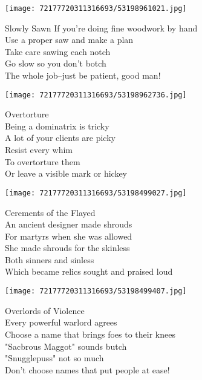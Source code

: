\documentclass[10pt,letterpaper]{article}
\begin{document}
\begin{center}\texttt{[image: 72177720311316693/53198961021.jpg]}
\end{center}
\begin{center}
Slowly Sawn
\vskip 0.2in
If you're doing fine woodwork by hand\\
Use a proper saw and make a plan\\
Take care sawing each notch\\
Go slow so you don't botch\\
The whole job--just be patient, good man!\\
\end{center}
\pagebreak

\begin{center}
\texttt{[image: 72177720311316693/53198962736.jpg]}
\end{center}

\begin{center}
Overtorture\\
\vskip 0.2in
Being a dominatrix is tricky\\
A lot of your clients are picky\\
Resist every whim\\
To overtorture them\\
Or leave a visible mark or hickey\\
\end{center}
\pagebreak

\begin{center}\texttt{[image: 72177720311316693/53198499027.jpg]}
\end{center}
\begin{center}
Cerements of the Flayed\\
\vskip 0.2in
An ancient designer made shrouds\\
For martyrs when she was allowed\\
She made shrouds for the skinless\\
Both sinners and sinless\\
Which became relics sought and praised loud\\
\end{center}
\pagebreak

\begin{center}\texttt{[image: 72177720311316693/53198499407.jpg]}
\end{center}
\begin{center}
Overlords of Violence\\
\vskip 0.2in
Every powerful warlord agrees\\
Choose a name that brings foes to their knees\\
"Sacbrous Maggot" sounds butch\\
"Snugglepuss" not so much\\
Don't choose names that put people at ease!\\
\end{center}
\pagebreak
\end{document}

